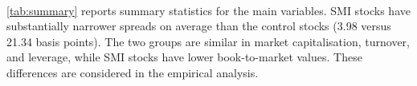 \vspace{0.8cm}

\TableOneDescription
\\

\autoref{tab:summary} reports summary statistics for the main variables. SMI stocks have substantially narrower spreads on average than the control stocks (3.98 versus 21.34 basis points). The two groups are similar in market capitalisation, turnover, and leverage, while SMI stocks have lower book-to-market values. These differences are considered in the empirical analysis.
